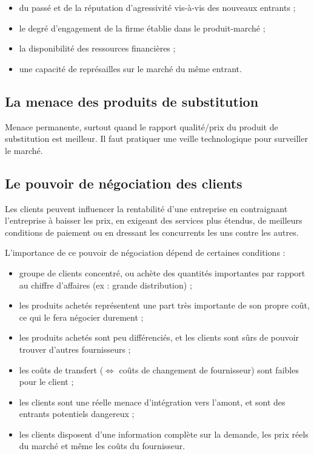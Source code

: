 		\begin{itemize}
			\item du passé et de la réputation d'agressivité vis-à-vis des nouveaux entrants ;
			\item le degré d'engagement de la firme établie dans le produit-marché ;
			\item la disponibilité des ressources financières ;
			\item une capacité de représailles sur le marché du même entrant.
		\end{itemize}
	
		 \subsection{La menace des produits de substitution}
		 
		 Menace permanente, surtout quand le rapport qualité/prix du produit de substitution est meilleur. Il faut pratiquer une veille technologique pour surveiller le marché.
		 
		 \subsection{Le pouvoir de négociation des clients}
		 
		 Les clients peuvent influencer la rentabilité d'une entreprise en contraignant l'entreprise à baisser les prix, en exigeant des services plus étendus, de meilleurs conditions de paiement ou en dressant les concurrents les uns contre les autres.
		 
		 L'importance de ce pouvoir de négociation dépend de certaines conditions :
		 
		 \begin{itemize}
		 	\item groupe de clients concentré, ou achète des quantités importantes par rapport au chiffre d'affaires (ex : grande distribution) ;
		 	\item les produits achetés représentent une part très importante de son propre coût, ce qui le fera négocier durement ;
		 	\item les produits achetés sont peu différenciés, et les clients sont sûrs de pouvoir trouver d'autres fournisseurs ;
		 	\item les coûts de transfert ($\Leftrightarrow$ coûts de changement de fournisseur) sont faibles pour le client ;
		 	\item les clients sont une réelle menace d'intégration vers l'amont, et sont des entrants potentiels dangereux ;
		 	\item les clients disposent d'une information complète sur la demande, les prix réels du marché et même les coûts du fournisseur.
		 \end{itemize}
		 
